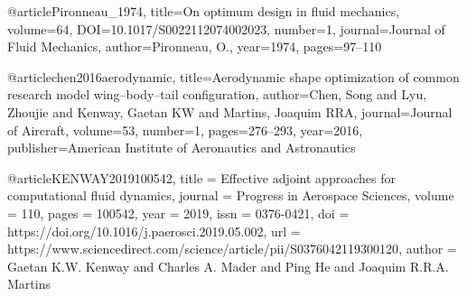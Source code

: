 @article{Pironneau_1974,
title={On optimum design in fluid mechanics},
volume={64},
DOI={10.1017/S0022112074002023},
number={1},
journal={Journal of Fluid Mechanics},
author={Pironneau, O.},
year={1974},
pages={97–110}}

@article{chen2016aerodynamic,
  title={Aerodynamic shape optimization of common research model wing--body--tail configuration},
  author={Chen, Song and Lyu, Zhoujie and Kenway, Gaetan KW and Martins, Joaquim RRA},
  journal={Journal of Aircraft},
  volume={53},
  number={1},
  pages={276--293},
  year={2016},
  publisher={American Institute of Aeronautics and Astronautics}
}

@article{KENWAY2019100542,
title = {Effective adjoint approaches for computational fluid dynamics},
journal = {Progress in Aerospace Sciences},
volume = {110},
pages = {100542},
year = {2019},
issn = {0376-0421},
doi = {https://doi.org/10.1016/j.paerosci.2019.05.002},
url = {https://www.sciencedirect.com/science/article/pii/S0376042119300120},
author = {Gaetan K.W. Kenway and Charles A. Mader and Ping He and Joaquim R.R.A. Martins}
}
